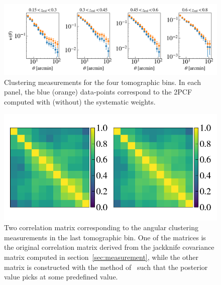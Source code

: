 \documentclass[fleqn,usenatbib,useAMS]{mnras}
\begin{document}
\begin{figure}
\includegraphics[width=\textwidth]{figures_tmp/xi.png}
\caption{\label{fig:xi} Clustering measurements for the four tomographic bins. In each panel, the blue (orange) data-points correspond to the 2PCF computed with (without) the systematic weights.} 
\end{figure}


\begin{figure}
\includegraphics[width=\textwidth]{figures_tmp/correlation_0_6.png}
\caption{\label{fig:xi} Two correlation matrix corresponding to the angular clustering measurements in the last tomographic bin. One of the matrices is the original correlation matrix derived from the jackknife covariance matrix computed in section~\ref{sec:measurement}, while the other matrix is constructed with the method of~\citet{sellentin2019} such that the posterior value picks at some predefined value.} 
\end{figure}
\end{document}
